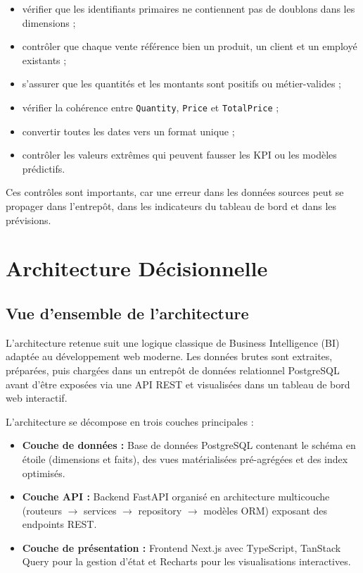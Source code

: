 \documentclass[12pt,a4paper,twoside]{report}
\begin{document}
\begin{itemize}
  \item vérifier que les identifiants primaires ne contiennent pas de doublons dans les dimensions ;
  \item contrôler que chaque vente référence bien un produit, un client et un employé existants ;
  \item s'assurer que les quantités et les montants sont positifs ou métier-valides ;
  \item vérifier la cohérence entre \texttt{Quantity}, \texttt{Price} et \texttt{TotalPrice} ;
  \item convertir toutes les dates vers un format unique ;
  \item contrôler les valeurs extrêmes qui peuvent fausser les KPI ou les modèles prédictifs.
\end{itemize}

Ces contrôles sont importants, car une erreur dans les données sources peut se propager dans l'entrepôt, dans les indicateurs du tableau de bord et dans les prévisions.

\chapter{Architecture Décisionnelle}

\section{Vue d'ensemble de l'architecture}

L'architecture retenue suit une logique classique de Business Intelligence (BI) adaptée au développement web moderne. Les données brutes sont extraites, préparées, puis chargées dans un entrepôt de données relationnel PostgreSQL avant d'être exposées via une API REST et visualisées dans un tableau de bord web interactif.

L'architecture se décompose en trois couches principales :

\begin{itemize}
  \item \textbf{Couche de données :} Base de données PostgreSQL contenant le schéma en étoile (dimensions et faits), des vues matérialisées pré-agrégées et des index optimisés.
  \item \textbf{Couche API :} Backend FastAPI organisé en architecture multicouche (routeurs $\rightarrow$ services $\rightarrow$ repository $\rightarrow$ modèles ORM) exposant des endpoints REST.
  \item \textbf{Couche de présentation :} Frontend Next.js avec TypeScript, TanStack Query pour la gestion d'état et Recharts pour les visualisations interactives.
\end{itemize}
\end{document}
